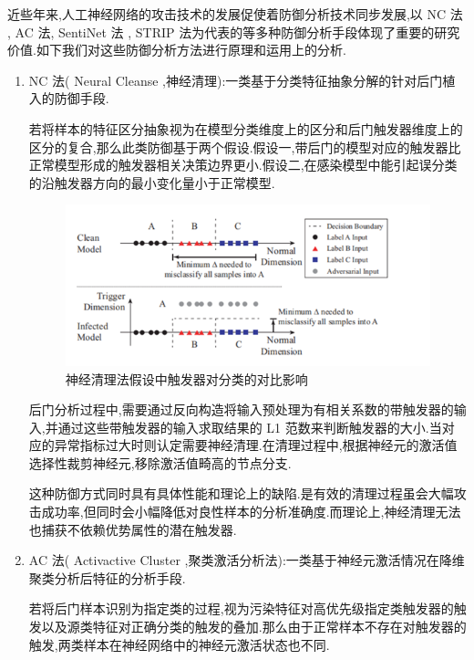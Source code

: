 近些年来,人工神经网络的攻击技术的发展促使着防御分析技术同步发展,以 NC 法 , AC 法, SentiNet 法 , STRIP 法为代表的等多种防御分析手段体现了重要的研究价值.如下我们对这些防御分析方法进行原理和运用上的分析.
\begin{enumerate}
	\item NC 法( Neural Cleanse ,神经清理):一类基于分类特征抽象分解的针对后门植入的防御手段.
	
	若将样本的特征区分抽象视为在模型分类维度上的区分和后门触发器维度上的区分的复合,那么此类防御基于两个假设.假设一,带后门的模型对应的触发器比正常模型形成的触发器相关决策边界更小.假设二,在感染模型中能引起误分类的沿触发器方向的最小变化量小于正常模型\cite{NCfa}.
	
	\begin{figure}
		\centering
		\includegraphics[scale=0.55]{Figures/toudu.png}
		\caption{神经清理法假设中触发器对分类的对比影响}
	\end{figure}
	
	后门分析过程中,需要通过反向构造将输入预处理为有相关系数的带触发器的输入,并通过这些带触发器的输入求取结果的 L1 范数来判断触发器的大小.当对应的异常指标过大时则认定需要神经清理.在清理过程中,根据神经元的激活值选择性裁剪神经元,移除激活值畸高的节点分支.
	
	这种防御方式同时具有具体性能和理论上的缺陷.是有效的清理过程虽会大幅攻击成功率,但同时会小幅降低对良性样本的分析准确度.而理论上,神经清理无法也捕获不依赖优势属性的潜在触发器.
	
	\item AC 法( Activactive Cluster ,聚类激活分析法):一类基于神经元激活情况在降维聚类分析后特征的分析手段.
	
	若将后门样本识别为指定类的过程,视为污染特征对高优先级指定类触发器的触发以及源类特征对正确分类的触发的叠加.那么由于正常样本不存在对触发器的触发,两类样本在神经网络中的神经元激活状态也不同\cite{ACfa}.
	

\end{enumerate}
